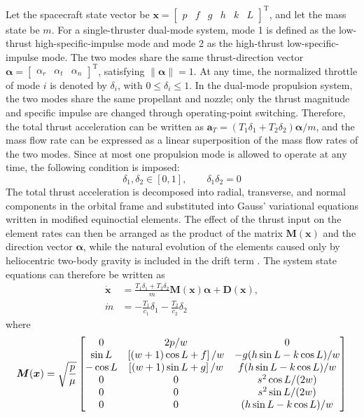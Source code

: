 ﻿\documentclass{IEEEtaes}
\begin{document}
Let the spacecraft state vector be $\bm{x}=\begin{bmatrix}p&f&g&h&k&L\end{bmatrix}^{\mathrm{T}}$, and let the mass state be $m$. For a single-thruster dual-mode system, mode 1 is defined as the low-thrust high-specific-impulse mode and mode 2 as the high-thrust low-specific-impulse mode. The two modes share the same thrust-direction vector $\bm{\alpha}=\begin{bmatrix}\alpha_r&\alpha_t&\alpha_n\end{bmatrix}^{\mathrm{T}}$, satisfying $\|\bm{\alpha}\|=1$. At any time, the normalized throttle of mode $i$ is denoted by $\delta_i$, with $0\leq\delta_i\leq1$. In the dual-mode propulsion system, the two modes share the same propellant and nozzle; only the thrust magnitude and specific impulse are changed through operating-point switching. Therefore, the total thrust acceleration can be written as $\bm{a}_T=(T_1\delta_1+T_2\delta_2)\bm{\alpha}/m$, and the mass flow rate can be expressed as a linear superposition of the mass flow rates of the two modes. Since at most one propulsion mode is allowed to operate at any time, the following condition is imposed:
\begin{equation}
\delta_1,\delta_2\in[0,1],\qquad \delta_1\delta_2=0
\end{equation}
The total thrust acceleration is decomposed into radial, transverse, and normal components in the orbital frame and substituted into Gauss' variational equations written in modified equinoctial elements. The effect of the thrust input on the element rates can then be arranged as the product of the matrix $\bm{M}(\bm{x})$ and the direction vector $\bm{\alpha}$, while the natural evolution of the elements caused only by heliocentric two-body gravity is included in the drift term \cite{jiang2012,chi2022}. The system state equations can therefore be written as
\begin{equation}
\begin{aligned}
\dot{\bm{x}}&=\frac{T_1\delta_1+T_2\delta_2}{m}\bm{M}(\bm{x})\bm{\alpha}+\bm{D}(\bm{x}),\\
\dot{m}&=-\frac{T_1}{c_1}\delta_1-\frac{T_2}{c_2}\delta_2
\end{aligned}
\end{equation}
where
\begin{equation}
\resizebox{0.98\columnwidth}{!}{$\displaystyle
\bm{M}(\bm{x})=\sqrt{\frac{p}{\mu}}
\begin{bmatrix}
0 & 2p/w & 0\\
\sin L & \left[(w+1)\cos L+f\right]/w & -g(h\sin L-k\cos L)/w\\
-\cos L & \left[(w+1)\sin L+g\right]/w & f(h\sin L-k\cos L)/w\\
0 & 0 & s^2\cos L/(2w)\\
0 & 0 & s^2\sin L/(2w)\\
0 & 0 & (h\sin L-k\cos L)/w
\end{bmatrix}
$}
\end{equation}
\end{document}
